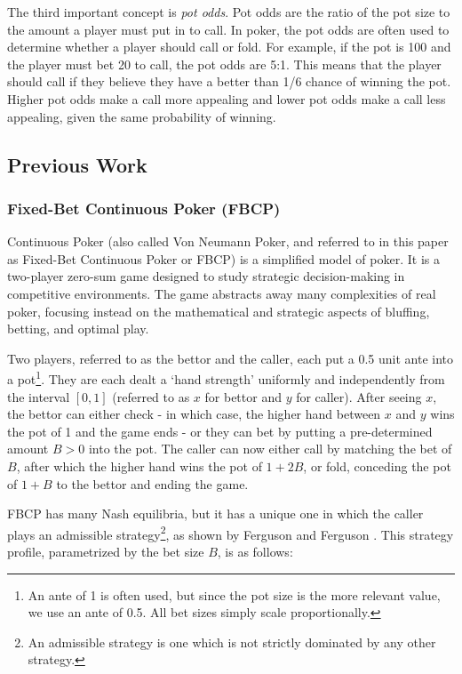 \documentclass[../../main/main.tex]{subfiles}
\begin{document}
The third important concept is \textit{pot odds}. Pot odds are the ratio of the pot size to the amount a player must put in to call. In poker, the pot odds are often used to determine whether a player should call or fold. For example, if the pot is 100 and the player must bet 20 to call, the pot odds are 5:1. This means that the player should call if they believe they have a better than 1/6 chance of winning the pot. Higher pot odds make a call more appealing and lower pot odds make a call less appealing, given the same probability of winning. 

\subsection{Previous Work}

\subsubsection{Fixed-Bet Continuous Poker (FBCP)}

Continuous Poker (also called Von Neumann Poker, and referred to in this paper as Fixed-Bet Continuous Poker or FBCP) is a simplified model of poker. It is a two-player zero-sum game designed to study strategic decision-making in competitive environments. The game abstracts away many complexities of real poker, focusing instead on the mathematical and strategic aspects of bluffing, betting, and optimal play.

\begin{definition}[FBCP]
Two players, referred to as the bettor and the caller, each put a 0.5 unit ante into a pot\footnote{An ante of 1 is often used, but since the pot size is the more relevant value, we use an ante of 0.5. All bet sizes simply scale proportionally.}. They are each dealt a `hand strength' uniformly and independently from the interval $[0, 1]$ (referred to as $x$ for bettor and $y$ for caller). After seeing $x$, the bettor can either check - in which case, the higher hand between $x$ and $y$ wins the pot of 1 and the game ends - or they can bet by putting a pre-determined amount $B > 0$ into the pot. The caller can now either call by matching the bet of $B$, after which the higher hand wins the pot of $1+2B$, or fold, conceding the pot of $1+B$ to the bettor and ending the game.
\end{definition}

FBCP has many Nash equilibria, but it has a unique one in which the caller plays an admissible strategy\footnote{An admissible strategy is one which is not strictly dominated by any other strategy.}, as shown by Ferguson and Ferguson \cite[p. 2]{ferguson2003borel}. This strategy profile, parametrized by the bet size $B$, is as follows:
\end{document}
